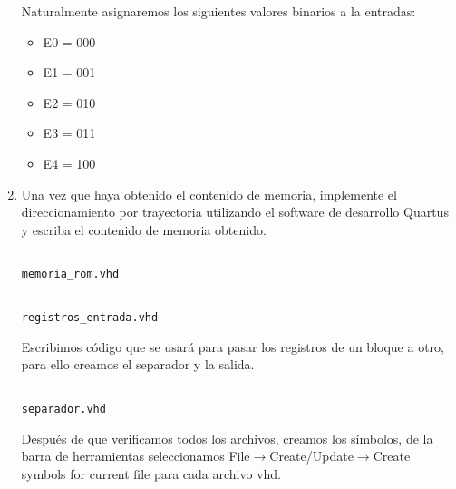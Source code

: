 \documentclass[table]{scrartcl}
\newenvironment{code}{\captionsetup{type=listing}}{}
\begin{document}
\begin{enumerate}
        Naturalmente asignaremos los siguientes valores binarios a la entradas:
        \begin{center}
          \centering{}
          \begin{itemize}
            \item E0 = 000
            \item E1 = 001
            \item E2 = 010
            \item E3 = 011
            \item E4 = 100
          \end{itemize}
        \end{center}
        \begin{center}
          \centering
          
        \end{center}
  \item Una vez que haya obtenido el contenido de memoria, implemente el
        direccionamiento por trayectoria utilizando el software de desarrollo
        Quartus y escriba el contenido de memoria obtenido.
        \begin{code}
          \inputminted{vhdl}{./memoria_rom.vhd}
          \caption{\texttt{memoria_rom.vhd}}
        \end{code}
        \begin{code}
          \inputminted{vhdl}{./registros_entrada.vhd}
          \caption{\texttt{registros_entrada.vhd}}
        \end{code}
        Escribimos código que se usará para pasar los registros de un bloque a otro,
        para ello creamos el separador y la salida.
        \begin{code}
          \inputminted{vhdl}{./separador.vhd}
          \caption{\texttt{separador.vhd}}
        \end{code}

        Después de que verificamos todos los archivos, creamos los símbolos, de la
        barra de herramientas seleccionamos File$\rightarrow$Create/Update$\rightarrow$Create symbols for
        current file para cada archivo vhd.


\end{enumerate}
\end{document}
